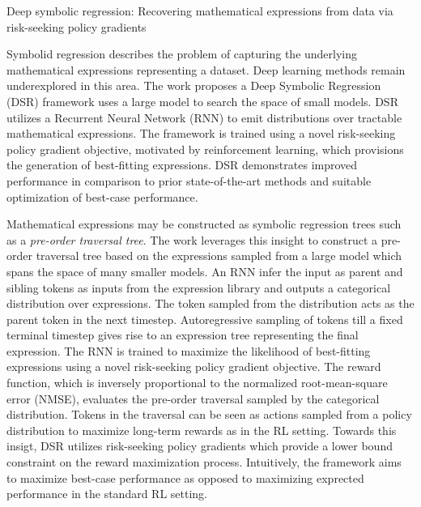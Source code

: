 \documentclass[11pt,letterpaper]{article}
\begin{document}
\begin{center}
  \large{Deep symbolic regression: Recovering mathematical expressions from data via risk-seeking policy gradients}
\end{center}

Symbolid regression describes the problem of capturing the underlying mathematical expressions representing a dataset. Deep learning methods remain underexplored in this area. The work proposes a Deep Symbolic Regression (DSR) framework uses a large model to search the space of small models. DSR utilizes a Recurrent Neural Network (RNN) to emit distributions over tractable mathematical expressions. The framework is trained using a novel risk-seeking policy gradient objective, motivated by reinforcement learning, which provisions the generation of best-fitting expressions. DSR demonstrates improved performance in comparison to prior state-of-the-art methods and suitable optimization of best-case performance. 

Mathematical expressions may be constructed as symbolic regression trees such as a \textit{pre-order traversal tree}. The work leverages this insight to construct a pre-order traversal tree based on the expressions sampled from a large model which spans the space of many smaller models. An RNN infer the input as parent and sibling tokens as inputs from the expression library and outputs a categorical distribution over expressions. The token sampled from the distribution acts as the parent token in the next timestep. Autoregressive sampling of tokens till a fixed terminal timestep gives rise to an expression tree representing the final expression. The RNN is trained to maximize the likelihood of best-fitting expressions using a novel risk-seeking policy gradient objective. The reward function, which is inversely proportional to the normalized root-mean-square error (NMSE), evaluates the pre-order traversal sampled by the categorical distribution. Tokens in the traversal can be seen as actions sampled from a policy distribution to maximize long-term rewards as in the RL setting. Towards this insigt, DSR utilizes risk-seeking policy gradients which provide a lower bound constraint on the reward maximization process. Intuitively, the framework aims to maximize best-case performance as opposed to maximizing exprected performance in the standard RL setting.
\end{document}
